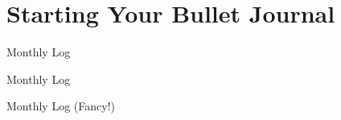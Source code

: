 \documentclass[aspectratio=169]{beamer}
\begin{document}
    \section{Starting Your Bullet Journal}

    {
    \begin{frame}{Monthly Log}
    \end{frame}
    }

    {
    \begin{frame}{Monthly Log}
    \end{frame}
    }

    {
    \begin{frame}{Monthly Log (Fancy!)}
    \end{frame}
    }
\end{document}
